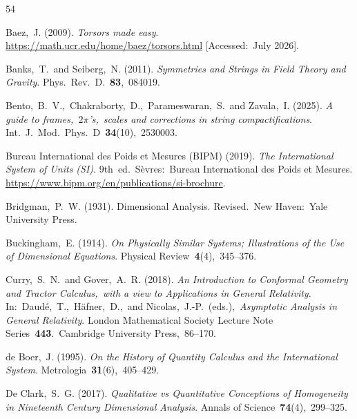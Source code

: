 \documentclass[12pt]{article}
\numberwithin{equation}{section}
\begin{document}
\begin{small} %
\singlespacing %

\begin{thebibliography}{54}

{Baez,~J.} (2009).
{\em Torsors made easy}.\\
\href{https://math.ucr.edu/home/baez/torsors.html}{https://math.ucr.edu/home/baez/torsors.html} [Accessed:~July 2026].

{Banks,~T.~and Seiberg,~N.} (2011).
{\em Symmetries and Strings in Field Theory and Gravity}.
Phys.~Rev.~D.~\textbf{83},~084019.

{Bento,~B.~V.,~Chakraborty,~D.,~Parameswaran,~S.~and Zavala,~I.} (2025).
{\em A guide to frames,~\ensuremath{2\pi}'s,~scales and corrections in string compactifications}.
Int.~J.~Mod.~Phys.~D~\textbf{34}(10),~2530003.

{Bureau International des Poids et Mesures (BIPM)} (2019).
{\em The International System of Units (SI)}.
9th~ed.~S\`evres:~Bureau International des Poids et Mesures.
\href{https://www.bipm.org/en/publications/si-brochure}{https://www.bipm.org/en/publications/si-brochure}.

{Bridgman,~P.~W.} (1931).
{Dimensional Analysis}.
Revised.~New Haven:~Yale University Press.

{Buckingham,~E.} (1914).
{\em On Physically Similar Systems; Illustrations of the Use of Dimensional Equations}.
Physical Review~\textbf{4}(4),~345--376.

{Curry,~S.~N.~and Gover,~A.~R.} (2018).
{\em An Introduction to Conformal Geometry and Tractor Calculus,~with a view to Applications in General Relativity}.
In:~Daud\'e,~T.,~H\"afner,~D.,~and Nicolas,~J.-P.~(eds.),~{\em Asymptotic Analysis in General Relativity}.
London Mathematical Society Lecture Note Series~\textbf{443}.~Cambridge University Press,~86--170.

{de Boer,~J.} (1995).
{\em On the History of Quantity Calculus and the International System}.
Metrologia~\textbf{31}(6),~405--429.

{De Clark,~S.~G.} (2017).
{\em Qualitative vs Quantitative Conceptions of Homogeneity in Nineteenth Century Dimensional Analysis}.
Annals of Science~\textbf{74}(4),~299--325.


\end{thebibliography}
\end{small}
\end{document}
